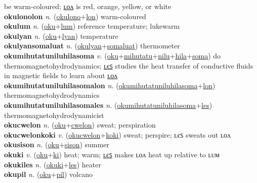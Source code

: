 be warm-coloured; \hyperref[okulonolon]{ʟᴏᴧ} is red, orange, yellow, or white \label{okulono} \\
\textbf{okulonolon} \textit{n.} (\hyperref[okulono]{okulono}+\hyperref[lon]{lon})
warm-coloured \label{okulonolon} \\
\textbf{okulum} \textit{n.} (\hyperref[oku]{oku}+\hyperref[lum]{lum})
reference temperature; lukewarm \label{okulum} \\
\textbf{okulyan} \textit{n.} (\hyperref[oku]{oku}+\hyperref[lyan]{lyan})
temperature \label{okulyan} \\
\textbf{okulyansomaluat} \textit{n.} (\hyperref[okulyan]{okulyan}+\hyperref[somaluat]{somaluat})
thermometer \label{okulyansomaluat} \\
\textbf{okumihutatuniluhilasoma} \textit{v.} (\hyperref[oku]{oku}+\hyperref[mihutatu]{mihutatu}+\hyperref[nilu]{nilu}+\hyperref[hila]{hila}+\hyperref[soma]{soma})
do thermomagnetohydrodynamics; \hyperref[okumihutatuniluhilasomales]{ʟєꜱ} studies the heat transfer of conductive fluids in magnetic fields to learn about \hyperref[okumihutatuniluhilasomalon]{ʟᴏᴧ} \label{okumihutatuniluhilasoma} \\
\textbf{okumihutatuniluhilasomalon} \textit{n.} (\hyperref[okumihutatuniluhilasoma]{okumihutatuniluhilasoma}+\hyperref[lon]{lon})
thermomagnetohydrodynamics \label{okumihutatuniluhilasomalon} \\
\textbf{okumihutatuniluhilasomales} \textit{n.} (\hyperref[okumihutatuniluhilasoma]{okumihutatuniluhilasoma}+\hyperref[les]{les})
thermomagnetohydrodynamicist \label{okumihutatuniluhilasomales} \\
\textbf{okucwelon} \textit{n.} (\hyperref[oku]{oku}+\hyperref[cwelon]{cwelon})
sweat; perspiration \label{okucwelon} \\
\textbf{okucwelonkoki} \textit{v.} (\hyperref[okucwelon]{okucwelon}+\hyperref[koki]{koki})
sweat; perspire; ʟєꜱ sweats out ʟᴏᴧ \label{okucwelonkoki} \\
\textbf{okusison} \textit{n.} (\hyperref[oku]{oku}+\hyperref[sison]{sison})
summer \label{okusison} \\
\textbf{okuki} \textit{v.} (\hyperref[oku]{oku}+\hyperref[ki]{ki})
heat; warm; \hyperref[okukiles]{ʟєꜱ} makes ʟᴏᴧ heat up relative to ʟᴜᴍ \label{okuki} \\
\textbf{okukiles} \textit{n.} (\hyperref[okuki]{okuki}+\hyperref[les]{les})
heater \label{okukiles} \\
\textbf{okupil} \textit{n.} (\hyperref[oku]{oku}+\hyperref[pil]{pil})
volcano \label{okupil} \\
